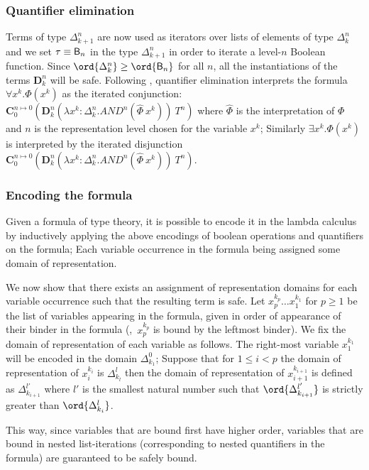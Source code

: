 \subsubsection{Quantifier elimination}
Terms of type $\Delta_{k+1}^n$ are now used as iterators over lists of elements of type $\Delta_k^n$ and we set $\tau \equiv \mathsf{B}_n$ in the type $\Delta_{k+1}^n$ in order to iterate a level-$n$ Boolean function. Since $\ord{\Delta_k^n} \geq \ord{\booltype_n}$ for all $n$, all the instantiations of the terms $\mathbf{D}_k^n$ will be safe. Following \cite{mairson1992spt}, quantifier elimination interprets the formula $\forall x^k.\Phi(x^k)$ as the iterated conjunction:
$\mathbf{C}_0^{n\mapsto 0} \left( \mathbf{D}_k^n(\lambda x^k:\Delta_k^n.AND^n(\hat\Phi~x^k))~T^n \right)$ where $\hat\Phi$ is the interpretation of $\Phi$
and $n$ is the representation level chosen for the variable $x^k$; Similarly $\exists x^k.\Phi(x^k)$  is interpreted by the iterated disjunction $\mathbf{C}_0^{n\mapsto 0} \left( \mathbf{D}_k^n(\lambda x^k:\Delta_k^n.AND^n(\hat\Phi~x^k))~T^n\right)$.

\subsubsection{Encoding the formula}

Given a formula of type theory, it is possible to encode it in the lambda calculus by inductively applying the above encodings of boolean operations and quantifiers on the formula; Each variable occurrence in the formula being assigned some domain of representation.

We now show that there exists an assignment of representation domains for each variable occurrence such that the resulting term is safe. Let $x^{k_p}_p \ldots x^{k_1}_1$ for $p\geq1$ be the list of variables appearing in the formula, given in order of appearance of their binder in the formula (\ie,~$x^{k_p}_p$ is bound by the leftmost binder). We fix the domain of representation of each variable as follows. The right-most variable $x^{k_1}_1$ will be encoded in the domain $\Delta^0_{k_1}$; Suppose that for $1\leq i< p$ the domain of representation of $x^{k_i}_i$ is $\Delta^l_{k_l}$ then the domain of representation of $x^{k_{i+1}}_{i+1}$ is defined as
$\Delta^{l'}_{k_{i+1}}$ where $l'$ is the smallest natural number such that $\ord{\Delta^{l'}_{k_{i+1}}}$ is strictly greater than $\ord{\Delta^{l}_{k_i}}$.

This way, since variables that are bound first have higher order, variables that are bound in  nested list-iterations (corresponding to nested quantifiers in the formula) are guaranteed to be safely bound.

